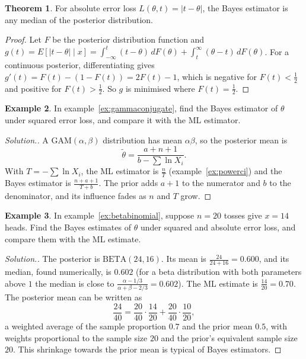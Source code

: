 \documentclass[12pt,a4paper]{report}
\theoremstyle{definition}
\newtheorem{thm}{Theorem}[section]
\newtheorem{exa}[thm]{Example}
\newenvironment{solution}
  {\renewcommand{\qedsymbol}{}\begin{proof}[\textit{Solution}.]}
  {\end{proof}}
\begin{document}
\begin{thm}
\label{thm:bayesabsolute}
For absolute error loss $L(\theta, t) = |t - \theta|$, the Bayes estimator is any median
of the posterior distribution.
\end{thm}

\begin{proof}
Let $F$ be the posterior distribution function and $g(t) = E\left[|t - \theta|\mid x\right]
= \int_{-\infty}^t(t - \theta)\,dF(\theta) + \int_t^\infty(\theta - t)\,dF(\theta)$. For a
continuous posterior, differentiating gives $g'(t) = F(t) - (1 - F(t)) = 2F(t) - 1$,
which is negative for $F(t)<\frac12$ and positive for $F(t)>\frac12$. So $g$ is
minimised where $F(t) = \frac12$.
\end{proof}

\begin{exa}
\label{ex:bayespower}
In example~\ref{ex:gammaconjugate}, find the Bayes estimator of $\theta$ under
squared error loss, and compare it with the ML estimator.
\end{exa}

\begin{solution}
A $\text{GAM}(\alpha, \beta)$ distribution has mean $\alpha\beta$, so the posterior mean
is
\[\tilde\theta = \frac{a + n + 1}{b - \sum\ln X_i} .\]
With $T = -\sum\ln X_i$, the ML estimator is $\frac nT$ (example~\ref{ex:powerci}) and
the Bayes estimator is $\frac{n + a + 1}{T + b}$. The prior adds $a + 1$ to the
numerator and $b$ to the denominator, and its influence fades as $n$ and $T$ grow.
\end{solution}

\begin{exa}
\label{ex:bayesbinomialnumbers}
In example~\ref{ex:betabinomial}, suppose $n = 20$ tosses give $x = 14$ heads. Find
the Bayes estimates of $\theta$ under squared and absolute error loss, and compare
them with the ML estimate.
\end{exa}

\begin{solution}
The posterior is $\text{BETA}(24, 16)$. Its mean is $\frac{24}{24 + 16} = 0.600$,
and its median, found numerically, is $0.602$ (for a beta distribution with both
parameters above $1$ the median is close to $\frac{\alpha - 1/3}{\alpha + \beta - 2/3} = 0.602$).
The ML estimate is $\frac{14}{20} = 0.70$. The posterior mean can be written as
\[\frac{24}{40} = \frac{20}{40}\cdot\frac{14}{20} + \frac{20}{40}\cdot\frac{10}{20},\]
a weighted average of the sample proportion $0.7$ and the prior mean $0.5$, with
weights proportional to the sample size $20$ and the prior's equivalent sample size
$20$. This shrinkage towards the prior mean is typical of Bayes estimators.
\end{solution}
\end{document}
